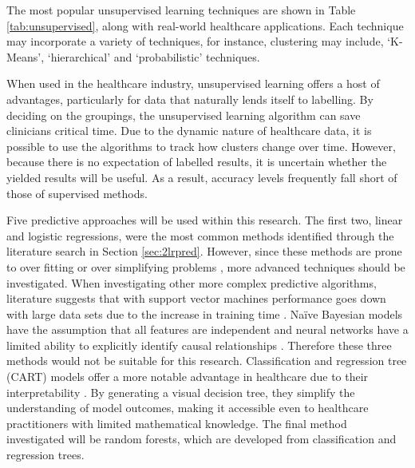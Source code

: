 \documentclass[../thesis.tex]{subfiles}
\begin{document}
The most popular unsupervised learning techniques are shown in Table \ref{tab:unsupervised}, along with real-world healthcare applications. Each technique may incorporate a variety of techniques, for instance, clustering may include, `K-Means', `hierarchical' and `probabilistic' techniques.
\begin{table}[h!]
    \centering{}
    \caption{Unsupervised learning methods and their applications across healthcare.}
    \label{tab:unsupervised}
\end{table}

When used in the healthcare industry, unsupervised learning offers a host of advantages, particularly for data that naturally lends itself to labelling. By deciding on the groupings, the unsupervised learning algorithm can save clinicians critical time. Due to the dynamic nature of healthcare data, it is possible to use the algorithms to track how clusters change over time. However, because there is no expectation of labelled results, it is uncertain whether the yielded results will be useful. As a result, accuracy levels frequently fall short of those of supervised methods.

Five predictive approaches will be used within this research. The first two, linear and logistic regressions, were the most common methods identified through the literature search in Section \ref{sec:2lrpred}. However, since these methods are prone to over fitting or over simplifying problems \cite{Ray2019}, more advanced techniques should be investigated. When investigating other more complex predictive algorithms, literature suggests that with support vector machines performance goes down with large data sets due to the increase in training time \cite{Ray2019}. Na\"{i}ve Bayesian models have the assumption that all features are independent \cite{Wickramasinghe2020} and neural networks have a limited ability to explicitly identify causal relationships \cite{Tu1996}. Therefore these three methods would not be suitable for this research. Classification and regression tree (CART) models offer a more notable advantage in healthcare due to their interpretability \cite{Ray2019}. By generating a visual decision tree, they simplify the understanding of model outcomes, making it accessible even to healthcare practitioners with limited mathematical knowledge. The final method investigated will be random forests, which are developed from classification and regression trees.
\end{document}
